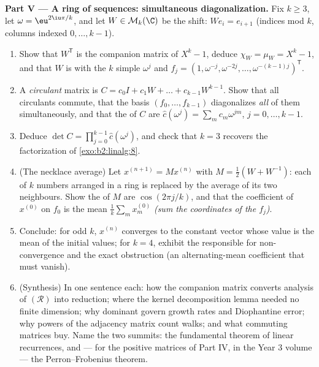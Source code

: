 \begin{problem}
\medskip
\noindent\textbf{Part V --- A ring of sequences: simultaneous
diagonalization.} Fix $k \geq 3$, let $\omega = \eu^{2\iu\pi/k}$,
and let $W \in \mathcal{M}_k(\C)$ be the  shift: $W e_i =
e_{i+1}$ (indices mod $k$, columns indexed $0, \dots, k-1$).
\begin{enumerate}[resume]
  \item Show that $W^{\mathsf T}$ is the companion matrix of
        $X^k - 1$, deduce $\chi_W = \mu_W = X^k - 1$, and that $W$ is
         with the $k$ simple 
        $\omega^j$ and  $f_j = (1, \omega^{-j},
        \omega^{-2j}, \dots, \omega^{-(k-1)j})^{\mathsf T}$.
  \item A \emph{circulant} matrix is $C = c_0 I + c_1 W + \dots
        + c_{k-1}W^{k-1}$. Show that all circulants commute,
        that the basis $(f_0, \dots, f_{k-1})$ diagonalizes
        \emph{all} of them simultaneously, and that the
         of $C$ are $\widehat c(\omega^j) = \sum_m
        c_m \omega^{jm}$, $j = 0, \dots, k-1$.
  \item Deduce $\det C = \prod_{j=0}^{k-1} \widehat
        c(\omega^j)$, and check that $k = 3$ recovers the
        factorization of \cref{exo:b2:linalg:8}.
  \item (The necklace average) Let $x^{(n+1)} = Mx^{(n)}$ with
        $M = \frac12(W + W^{-1})$: each of $k$ numbers arranged
        in a ring is replaced by the average of its two
        neighbours. Show the  of $M$ are
        $\cos(2\pi j/k)$, and that the coefficient of $x^{(0)}$
        on $f_0$ is the mean $\frac1k\sum_m x^{(0)}_m$
        \emph{(sum the coordinates of the $f_j$)}.
  \item Conclude: for odd $k$, $x^{(n)}$ converges to the
        constant vector whose value is the mean of the initial
        values; for $k = 4$, exhibit the  responsible
        for non-convergence and the exact obstruction
        (an alternating-mean coefficient that must vanish).
  \item (Synthesis) In one sentence each: how the companion
        matrix converts analysis of $(\mathcal R)$ into
        reduction; where the kernel decomposition lemma needed
        no finite dimension; why dominant  govern
        growth rates and Diophantine error; why powers of the
        adjacency matrix count walks; and what commuting
        matrices buy. Name the two summits: the fundamental
        theorem of linear recurrences, and --- for the positive
        matrices of Part IV, in the Year 3 volume --- the
        Perron--Frobenius theorem.
\end{enumerate}
\end{problem}
